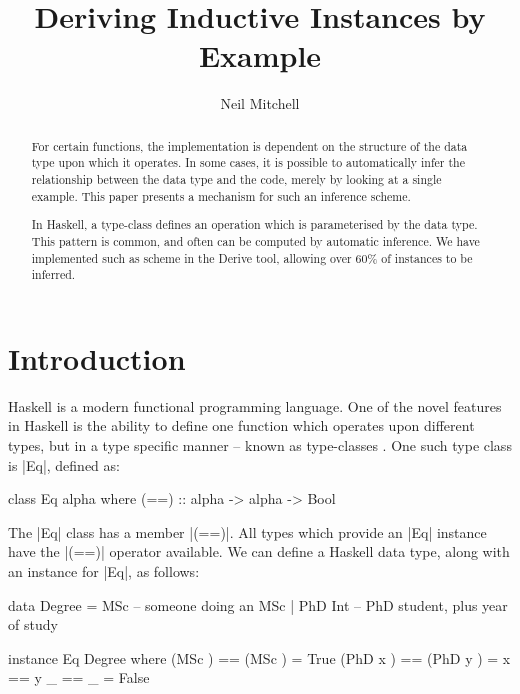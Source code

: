 \documentclass{llncs}
\begin{document}
\title{Deriving Inductive Instances by Example}
\author{Neil Mitchell}


\maketitle

\begin{abstract}
For certain functions, the implementation is dependent on the structure of the data type upon which it operates. In some cases, it is possible to automatically infer the relationship between the data type and the code, merely by looking at a single example. This paper presents a mechanism for such an inference scheme.

In Haskell, a type-class defines an operation which is parameterised by the data type. This pattern is common, and often can be computed by automatic inference. We have implemented such as scheme in the Derive tool, allowing over 60\% of instances to be inferred.
\end{abstract}

\section{Introduction}

Haskell \cite{haskell} is a modern functional programming language. One of the novel features in Haskell is the ability to define one function which operates upon different types, but in a type specific manner -- known as type-classes \cite{wadler:type_classes}. One such type class is |Eq|, defined as:

\begin{code}
class Eq alpha where
    (==) :: alpha -> alpha -> Bool
\end{code}

The |Eq| class has a member |(==)|. All types which provide an |Eq| instance have the |(==)| operator available. We can define a Haskell data type, along with an instance for |Eq|, as follows:

\begin{code}
data Degree  =  MSc        -- someone doing an MSc
             |  PhD Int    -- PhD student, plus year of study

instance Eq Degree where
    (MSc    )  == (MSc    )  = True
    (PhD x  )  == (PhD y  )  = x == y
    _          == _          = False
\end{code}
\end{document}
